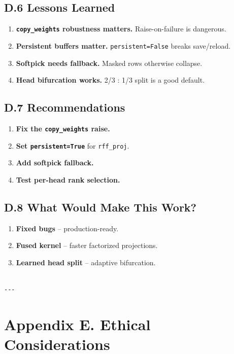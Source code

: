 \subsection{D.6 Lessons Learned}

\begin{enumerate}
\item \textbf{\texttt{copy\_weights} robustness matters.} Raise-on-failure is dangerous.
\item \textbf{Persistent buffers matter.} \texttt{persistent=False} breaks save/reload.
\item \textbf{Softpick needs fallback.} Masked rows otherwise collapse.
\item \textbf{Head bifurcation works.} 2/3 : 1/3 split is a good default.

\end{enumerate}
\subsection{D.7 Recommendations}

\begin{enumerate}
\item \textbf{Fix the \texttt{copy\_weights} raise.}
\item \textbf{Set \texttt{persistent=True}} for \texttt{rff\_proj}.
\item \textbf{Add softpick fallback.}
\item \textbf{Test per-head rank selection.}

\end{enumerate}
\subsection{D.8 What Would Make This Work?}

\begin{enumerate}
\item \textbf{Fixed bugs} -- production-ready.
\item \textbf{Fused kernel} -- faster factorized projections.
\item \textbf{Learned head split} -- adaptive bifurcation.
\end{enumerate}
\begin{lstlisting}

---
\end{lstlisting}


\section{Appendix E. Ethical Considerations}

